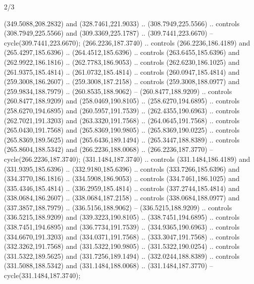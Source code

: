 \begin{flagdescription}{2/3}
\begin{scope}[xshift=0.5\flaglength,yshift=0.5\flagwidth,scale=\flagwidth/318.91]
\begin{scope}[y=0.8pt, x=0.8pt, yscale=-1,shift={(-298.97,-199.32)}]
  (349.5088,208.2832) and (328.7461,221.9033) .. (308.7949,225.5566) .. controls
  (308.7949,225.5566) and (309.3369,225.1787) .. (309.7441,223.6670) --
  cycle(309.7441,223.6670);
 (266.2236,187.3740) .. controls
  (266.2236,186.4189) and (265.4297,185.6396) .. (264.4512,185.6396) .. controls
  (263.6455,185.6396) and (262.9922,186.1816) .. (262.7783,186.9053) .. controls
  (262.6230,186.1025) and (261.9375,185.4814) .. (261.0732,185.4814) .. controls
  (260.0947,185.4814) and (259.3008,186.2607) .. (259.3008,187.2158) .. controls
  (259.3008,188.0977) and (259.9834,188.7979) .. (260.8535,188.9062) --
  (260.8477,188.9209) .. controls (260.8477,188.9209) and (258.0469,190.8105) ..
  (258.6270,194.6895) .. controls (258.6270,194.6895) and (260.5957,191.7539) ..
  (262.4355,190.6963) .. controls (262.7021,191.3203) and (263.3320,191.7568) ..
  (264.0645,191.7568) .. controls (265.0430,191.7568) and (265.8369,190.9805) ..
  (265.8369,190.0225) .. controls (265.8369,189.5625) and (265.6436,189.1494) ..
  (265.3447,188.8389) .. controls (265.8604,188.5342) and (266.2236,188.0068) ..
  (266.2236,187.3770) -- cycle(266.2236,187.3740);
 (331.1484,187.3740) .. controls
  (331.1484,186.4189) and (331.9395,185.6396) .. (332.9180,185.6396) .. controls
  (333.7266,185.6396) and (334.3770,186.1816) .. (334.5908,186.9053) .. controls
  (334.7461,186.1025) and (335.4346,185.4814) .. (336.2959,185.4814) .. controls
  (337.2744,185.4814) and (338.0684,186.2607) .. (338.0684,187.2158) .. controls
  (338.0684,188.0977) and (337.3857,188.7979) .. (336.5156,188.9062) --
  (336.5215,188.9209) .. controls (336.5215,188.9209) and (339.3223,190.8105) ..
  (338.7451,194.6895) .. controls (338.7451,194.6895) and (336.7734,191.7539) ..
  (334.9365,190.6963) .. controls (334.6670,191.3203) and (334.0371,191.7568) ..
  (333.3047,191.7568) .. controls (332.3262,191.7568) and (331.5322,190.9805) ..
  (331.5322,190.0254) .. controls (331.5322,189.5625) and (331.7256,189.1494) ..
  (332.0244,188.8389) .. controls (331.5088,188.5342) and (331.1484,188.0068) ..
  (331.1484,187.3770) -- cycle(331.1484,187.3740);
\end{scope}
\end{scope}
\framecode{}
\end{flagdescription}
